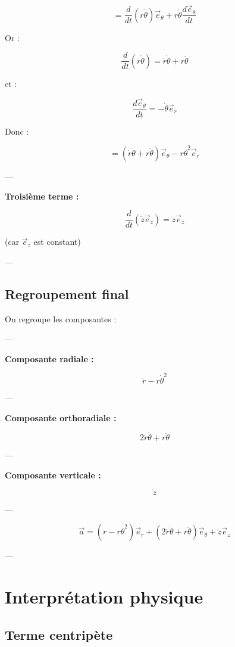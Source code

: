 \documentclass[11pt,a4paper]{article}
\begin{document}
\[
= \frac{d}{dt}(r\dot{\theta})\vec{e}_\theta
+ r\dot{\theta}\frac{d\vec{e}_\theta}{dt}
\]

Or :

\[
\frac{d}{dt}(r\dot{\theta}) = \dot{r}\dot{\theta} + r\ddot{\theta}
\]

et :

\[
\frac{d\vec{e}_\theta}{dt} = -\dot{\theta}\vec{e}_r
\]

Donc :

\[
= (\dot{r}\dot{\theta} + r\ddot{\theta})\vec{e}_\theta
- r\dot{\theta}^2 \vec{e}_r
\]

---

\textbf{Troisième terme :}

\[
\frac{d}{dt}(\dot{z}\vec{e}_z) = \ddot{z}\vec{e}_z
\]

(car $\vec{e}_z$ est constant)

---

\subsection{Regroupement final}

On regroupe les composantes :

---

\textbf{Composante radiale :}

\[
\ddot{r} - r\dot{\theta}^2
\]

---

\textbf{Composante orthoradiale :}

\[
2\dot{r}\dot{\theta} + r\ddot{\theta}
\]

---

\textbf{Composante verticale :}

\[
\ddot{z}
\]

---

\[
\boxed{
\vec{a} =
(\ddot{r} - r\dot{\theta}^2)\vec{e}_r
+
(2\dot{r}\dot{\theta} + r\ddot{\theta})\vec{e}_\theta
+
\ddot{z}\vec{e}_z
}
\]

---

\section{Interprétation physique}

\subsection{Terme centripète}
\end{document}
